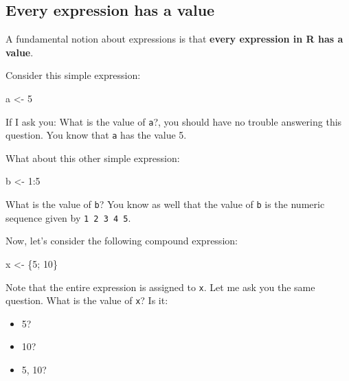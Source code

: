 \documentclass[
]{book}
\newenvironment{Shaded}{\begin{snugshade}}{\end{snugshade}}
\newcommand{\DecValTok}[1]{\textcolor[rgb]{0.00,0.00,0.81}{#1}}
\newcommand{\NormalTok}[1]{#1}
\newcommand{\OtherTok}[1]{\textcolor[rgb]{0.56,0.35,0.01}{#1}}
\newcommand{\SpecialCharTok}[1]{\textcolor[rgb]{0.00,0.00,0.00}{#1}}
\providecommand{\tightlist}{%
  \setlength{\itemsep}{0pt}\setlength{\parskip}{0pt}}
\begin{document}
\hypertarget{every-expression-has-a-value}{%
\subsection{Every expression has a value}\label{every-expression-has-a-value}}

A fundamental notion about expressions is that
\textbf{every expression in R has a value}.

Consider this simple expression:

\begin{Shaded}
\begin{Highlighting}[]
\NormalTok{a }\OtherTok{\textless{}{-}} \DecValTok{5}
\end{Highlighting}
\end{Shaded}

If I ask you: What is the value of \texttt{a}?, you should have no trouble answering
this question. You know that \texttt{a} has the value 5.

What about this other simple expression:

\begin{Shaded}
\begin{Highlighting}[]
\NormalTok{b }\OtherTok{\textless{}{-}} \DecValTok{1}\SpecialCharTok{:}\DecValTok{5}
\end{Highlighting}
\end{Shaded}

What is the value of \texttt{b}? You know as well that the value of \texttt{b} is the
numeric sequence given by \texttt{1\ 2\ 3\ 4\ 5}.

Now, let's consider the following compound expression:

\begin{Shaded}
\begin{Highlighting}[]
\NormalTok{x }\OtherTok{\textless{}{-}}\NormalTok{ \{}\DecValTok{5}\NormalTok{; }\DecValTok{10}\NormalTok{\}}
\end{Highlighting}
\end{Shaded}

Note that the entire expression is assigned to \texttt{x}. Let me ask you the same
question. What is the value of \texttt{x}? Is it:

\begin{itemize}
\tightlist
\item
  5?
\item
  10?
\item
  5, 10?
\end{itemize}
\end{document}
